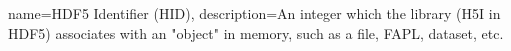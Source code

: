 \makeglossaries

{
        name=HDF5 Identifier (HID),
        description={An integer which the library (H5I in HDF5) associates with an
                     "object" in memory, such as a file, FAPL, dataset, etc.}
}


 
